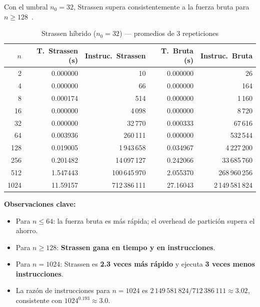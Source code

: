 \documentclass[12pt,a4paper]{article}
\begin{document}
Con el umbral $n_0 = 32$, Strassen supera consistentemente a la fuerza bruta
para $n \ge 128$~\cite{benson2014framework}.

\begin{table}[H]
\centering
\caption{Strassen h\'ibrido ($n_0 = 32$) --- promedios de 3 repeticiones}
\label{tab:hibrido}
\begin{tabular}{rrrrr}
\toprule
$n$ & T.\ Strassen (s) & Instruc.\ Strassen & T.\ Bruta (s) & Instruc.\ Bruta \\
\midrule
    2 & 0.000000 &              10 & 0.000000 &              26 \\
    4 & 0.000000 &              66 & 0.000000 &             164 \\
    8 & 0.000174 &             514 & 0.000000 &           1\,160 \\
   16 & 0.000000 &           4\,098 & 0.000000 &           8\,720 \\
   32 & 0.000000 &          32\,770 & 0.000333 &          67\,616 \\
   64 & 0.003936 &         260\,111 & 0.000000 &         532\,544 \\
  128 & 0.019005 &       1\,943\,658 & 0.034967 &       4\,227\,200 \\
  256 & 0.201482 &      14\,097\,127 & 0.242066 &      33\,685\,760 \\
  512 & 1.547443 &     100\,645\,970 & 2.055370 &     268\,960\,256 \\
 1024 & 11.59157 &     712\,386\,111 & 27.16043 &   2\,149\,581\,824 \\
\bottomrule
\end{tabular}
\end{table}

\noindent\textbf{Observaciones clave:}
\begin{itemize}
    \item Para $n \le 64$: la fuerza bruta es m\'as r\'apida; el overhead de
          partici\'on supera el ahorro.
    \item Para $n \ge 128$: \textbf{Strassen gana en tiempo y en instrucciones}.
    \item Para $n = 1024$: Strassen es \textbf{2.3 veces m\'as r\'apido} y
          ejecuta \textbf{3 veces menos instrucciones}.
    \item La raz\'on de instrucciones para $n = 1024$ es
          $2\,149\,581\,824 / 712\,386\,111 \approx 3{.}02$, consistente con
          $1024^{0.193} \approx 3{.}0$.
\end{itemize}
\end{document}

